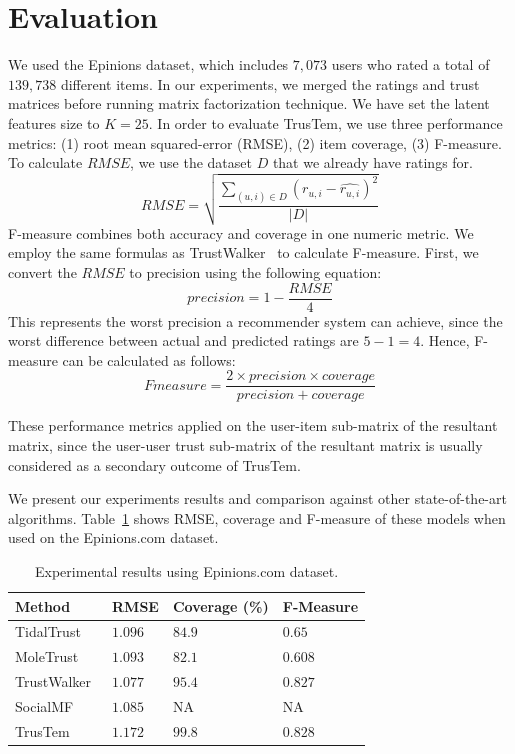 \documentclass[11pt, conference, onecolumn]{IEEEtran}
\begin{document}
\section{Evaluation}
We used the Epinions dataset, which includes $7,073$ users who rated a total of $139,738$ different items. In our experiments, we merged the ratings and trust matrices before running matrix factorization technique. We have set the latent features size to $K = 25$. In order to evaluate TrusTem, we use three performance metrics: (1) root mean squared-error (RMSE), (2) item coverage, (3) F-measure.
To calculate $RMSE$, we use the dataset $D$ that we already have ratings for.
\begin{equation}
RMSE = \sqrt{\frac{\sum_{(u,i)\in D}\left(r_{u,i} - \widehat{r_{u,i}} \right)^2}{|D|}}
\end{equation}
F-measure combines both accuracy and coverage in one numeric metric. We employ the same formulas as TrustWalker~\cite{Jamali:2009} to calculate F-measure. First, we convert the $RMSE$ to precision using the following equation:
\begin{equation}
precision = 1 - \frac{RMSE}{4}
\end{equation}
This represents the worst precision a recommender system can achieve, since the worst difference between actual and predicted ratings are $5-1 = 4$. Hence, F-measure can be calculated as follows:
\begin{equation}
Fmeasure = \frac{2\times precision \times coverage}{precision + coverage}
\end{equation}

These performance metrics applied on the user-item sub-matrix of the resultant matrix, since the user-user trust sub-matrix of the resultant matrix is usually considered as a secondary outcome of TrusTem.

We present our experiments results and comparison against other state-of-the-art algorithms. Table~\ref{tab:results} shows RMSE, coverage and F-measure of these models when used on the Epinions.com dataset. 

\begin{table}
\centering

\begin{tabular}{|l|l|l|l|}
\hline
\textbf{Method}            & \textbf{RMSE}    & \textbf{Coverage (\%)} & \textbf{F-Measure} \\ \hline \hline
TidalTrust~\cite{Golbeck:2005}  & $1.096$ & $84.9$        & $0.65$    \\ \hline
MoleTrust~\cite{Massa:2007}   & $1.093$ & $82.1$        & $0.608$   \\ \hline
TrustWalker~\cite{Jamali:2009} & $1.077$ & $95.4$        & $0.827$   \\ \hline
SocialMF~\cite{Jamali:2010}    & $1.085$ & NA            & NA        \\ \hline
TrusTem     & $1.172$ & $99.8$        & $0.828$   \\ \hline
\end{tabular}
\caption{Experimental results using Epinions.com dataset.}
\label{tab:results}
\end{table}
\end{document}
